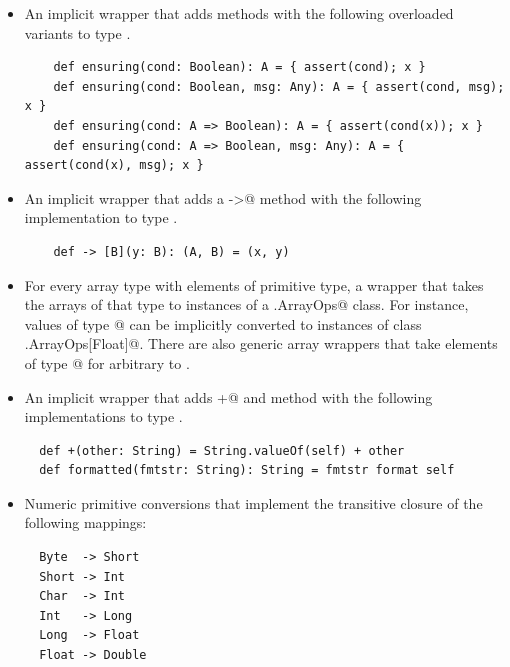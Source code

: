 \begin{itemize}
\item
An implicit wrapper that adds \lstinline@ensuring@ methods 
with the following overloaded variants to type \lstinline@Any@.
\begin{lstlisting}
    def ensuring(cond: Boolean): A = { assert(cond); x }
    def ensuring(cond: Boolean, msg: Any): A = { assert(cond, msg); x }
    def ensuring(cond: A => Boolean): A = { assert(cond(x)); x }
    def ensuring(cond: A => Boolean, msg: Any): A = { assert(cond(x), msg); x }
\end{lstlisting}
\item
An implicit wrapper that adds a \lstinline@->@ method with the following implementation
to type \lstinline@Any@.
\begin{lstlisting}
    def -> [B](y: B): (A, B) = (x, y)
\end{lstlisting}
\item
For every array type with elements of primitive type, a wrapper that
takes the arrays of that type to instances of a \lstinline@runtime.ArrayOps@
class. For instance, values of type \lstinline@Array[Float]@ can be implicitly
converted to instances of class \lstinline@runtime.ArrayOps[Float]@.  There are
also generic array wrappers that take elements of type \lstinline@Array[T]@ for
arbitrary \lstinline@T@ to \lstinline@ArrayOps@s.
\item
An implicit wrapper that adds \lstinline@+@ and \lstinline@formatted@ method with the following implementations
to type \lstinline@Any@.
\begin{lstlisting}
  def +(other: String) = String.valueOf(self) + other
  def formatted(fmtstr: String): String = fmtstr format self
\end{lstlisting}
\item
Numeric primitive conversions that implement the transitive closure of the following
mappings:

\begin{minipage}{\linewidth}
\begin{lstlisting}
  Byte  -> Short
  Short -> Int
  Char  -> Int
  Int   -> Long
  Long  -> Float
  Float -> Double
\end{lstlisting}
\end{minipage}


\end{itemize}
